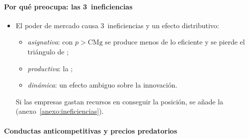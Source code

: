 \documentclass[11pt]{article}
\begin{document}
\paragraph{Por qué preocupa: las 3~ineficiencias}

\begin{itemize}
\item El poder de mercado causa 3~ineficiencias y un efecto distributivo:
  \begin{itemize}
  \item \emph{asignativa}: con $p>\mathrm{CMg}$ se produce menos de lo eficiente y se pierde el triángulo de \textcite{Harberger1954Monopoly} ;
  \item \emph{productiva}: la  ;
  \item \emph{dinámica}: un efecto ambiguo sobre la innovación.
  \end{itemize}
  Si las empresas gastan recursos en conseguir la posición, se añade la  (anexo~\ref{anexo:ineficiencias}).
\end{itemize}

\paragraph{Conductas anticompetitivas y precios predatorios}
\end{document}
